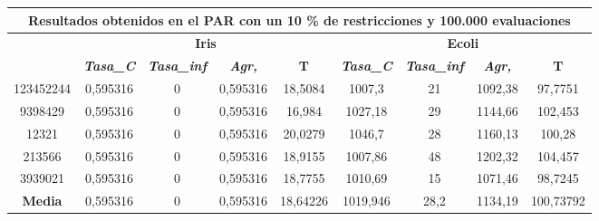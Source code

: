 \documentclass[12pt, spanish]{article}
\begin{document}
\begin{table}[H]
\begin{tabular}{|c|c|c|c|c|c|c|c|c|}
\hline
\multicolumn{9}{|c|}{\textbf{Resultados obtenidos en el PAR con un 10 \% de restricciones y 100.000 evaluaciones}}                                                                                                \\ \hline
\multirow{2}{*}{} & \multicolumn{4}{c|}{\textbf{Iris}}                                                            & \multicolumn{4}{c|}{\textbf{Ecoli}}                                                           \\ \cline{2-9} 
                  & \textit{\textbf{Tasa\_C}} & \textit{\textbf{Tasa\_inf}} & \textit{\textbf{Agr,}} & \textbf{T} & \textit{\textbf{Tasa\_C}} & \textit{\textbf{Tasa\_inf}} & \textit{\textbf{Agr,}} & \textbf{T} \\ \hline
123452244         & 0,595316                  & 0                           & 0,595316               & 18,5084    & 1007,3                    & 21                          & 1092,38                & 97,7751    \\ \hline
9398429           & 0,595316                  & 0                           & 0,595316               & 16,984     & 1027,18                   & 29                          & 1144,66                & 102,453    \\ \hline
12321             & 0,595316                  & 0                           & 0,595316               & 20,0279    & 1046,7                    & 28                          & 1160,13                & 100,28     \\ \hline
213566            & 0,595316                  & 0                           & 0,595316               & 18,9155    & 1007,86                   & 48                          & 1202,32                & 104,457    \\ \hline
3939021           & 0,595316                  & 0                           & 0,595316               & 18,7755    & 1010,69                   & 15                          & 1071,46                & 98,7245    \\ \hline
\textbf{Media}    & 0,595316                  & 0                           & 0,595316               & 18,64226   & 1019,946                  & 28,2                        & 1134,19                & 100,73792  \\ \hline
\end{tabular}
\end{table}
\end{document}
